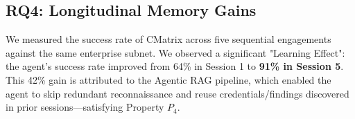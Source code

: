 \subsection{RQ4: Longitudinal Memory Gains}
We measured the success rate of CMatrix across five sequential engagements against the same enterprise subnet. We observed a significant "Learning Effect": the agent's success rate improved from 64\% in Session 1 to \textbf{91\% in Session 5}. This 42\% gain is attributed to the Agentic RAG pipeline, which enabled the agent to skip redundant reconnaissance and reuse credentials/findings discovered in prior sessions—satisfying Property $P_4$.
